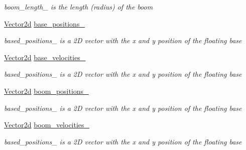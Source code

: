 \begin{DoxyCompactItemize}
\begin{DoxyCompactList}\small\item\em boom\+\_\+length\+\_\+ is the length (radius) of the boom \end{DoxyCompactList}\item 
\mbox{\label{classblmc__robots_1_1Stuggihop_a2c2e6bad59b31a36f0cbadb2516afcba}} 
\hyperlink{common__header_8hpp_acb6916bc8c9fe9d98c484fd4cc201447}{Vector2d} \hyperlink{classblmc__robots_1_1Stuggihop_a2c2e6bad59b31a36f0cbadb2516afcba}{base\+\_\+positions\+\_\+}
\begin{DoxyCompactList}\small\item\em based\+\_\+positions\+\_\+ is a 2D vector with the x and y position of the floating base \end{DoxyCompactList}\item 
\mbox{\label{classblmc__robots_1_1Stuggihop_a15b92fee74712cb5fae01bfc9204e86b}} 
\hyperlink{common__header_8hpp_acb6916bc8c9fe9d98c484fd4cc201447}{Vector2d} \hyperlink{classblmc__robots_1_1Stuggihop_a15b92fee74712cb5fae01bfc9204e86b}{base\+\_\+velocities\+\_\+}
\begin{DoxyCompactList}\small\item\em based\+\_\+positions\+\_\+ is a 2D vector with the x and y position of the floating base \end{DoxyCompactList}\item 
\mbox{\label{classblmc__robots_1_1Stuggihop_ade07babef35f510b27bf1a6aa4a4a7bd}} 
\hyperlink{common__header_8hpp_acb6916bc8c9fe9d98c484fd4cc201447}{Vector2d} \hyperlink{classblmc__robots_1_1Stuggihop_ade07babef35f510b27bf1a6aa4a4a7bd}{boom\+\_\+positions\+\_\+}
\begin{DoxyCompactList}\small\item\em based\+\_\+positions\+\_\+ is a 2D vector with the x and y position of the floating base \end{DoxyCompactList}\item 
\mbox{\label{classblmc__robots_1_1Stuggihop_a1ba0991f17e42a011eddac7aa198f476}} 
\hyperlink{common__header_8hpp_acb6916bc8c9fe9d98c484fd4cc201447}{Vector2d} \hyperlink{classblmc__robots_1_1Stuggihop_a1ba0991f17e42a011eddac7aa198f476}{boom\+\_\+velocities\+\_\+}
\begin{DoxyCompactList}\small\item\em based\+\_\+positions\+\_\+ is a 2D vector with the x and y position of the floating base \end{DoxyCompactList}\item 

\end{DoxyCompactItemize}
